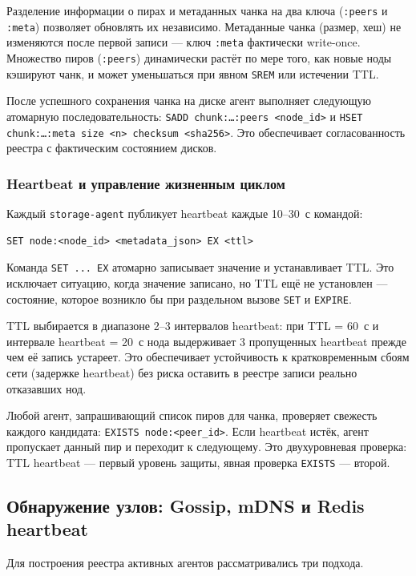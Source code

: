 Разделение информации о пирах и метаданных чанка на два ключа (\texttt{:peers} и \texttt{:meta}) позволяет обновлять их независимо. Метаданные чанка (размер, хеш) не изменяются после первой записи --- ключ \texttt{:meta} фактически write-once. Множество пиров (\texttt{:peers}) динамически растёт по мере того, как новые ноды кэшируют чанк, и может уменьшаться при явном \texttt{SREM} или истечении TTL.

После успешного сохранения чанка на диске агент выполняет следующую атомарную последовательность: \texttt{SADD chunk:\ldots:peers <node\_id>} и \texttt{HSET chunk:\ldots:meta size <n> checksum <sha256>}. Это обеспечивает согласованность реестра с фактическим состоянием дисков.

\subsubsection{Heartbeat и управление жизненным циклом}

Каждый \texttt{storage-agent} публикует heartbeat каждые 10--30~с командой:

\begin{verbatim}
SET node:<node_id> <metadata_json> EX <ttl>
\end{verbatim}

Команда \texttt{SET ... EX} атомарно записывает значение и устанавливает TTL. Это исключает ситуацию, когда значение записано, но TTL ещё не установлен --- состояние, которое возникло бы при раздельном вызове \texttt{SET} и \texttt{EXPIRE}.

TTL выбирается в диапазоне 2--3 интервалов heartbeat: при TTL = 60~с и интервале heartbeat = 20~с нода выдерживает 3 пропущенных heartbeat прежде чем её запись устареет. Это обеспечивает устойчивость к кратковременным сбоям сети (задержке heartbeat) без риска оставить в реестре записи реально отказавших нод.

Любой агент, запрашивающий список пиров для чанка, проверяет свежесть каждого кандидата: \texttt{EXISTS node:<peer\_id>}. Если heartbeat истёк, агент пропускает данный пир и переходит к следующему. Это двухуровневая проверка: TTL heartbeat --- первый уровень защиты, явная проверка \texttt{EXISTS} --- второй.

\subsection{Обнаружение узлов: Gossip, mDNS и Redis heartbeat}

Для построения реестра активных агентов рассматривались три подхода.

